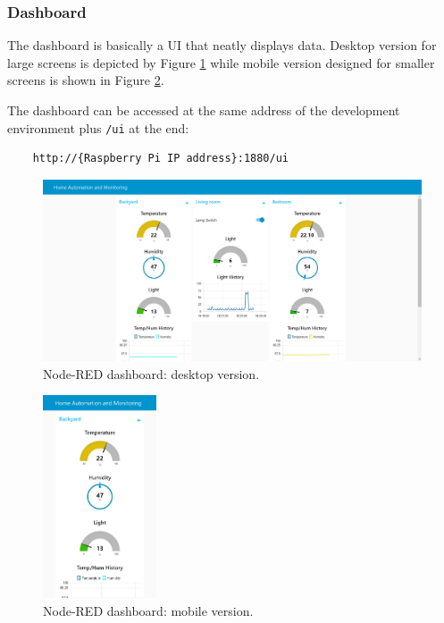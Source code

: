 \subsubsection{Dashboard}
The dashboard is basically a UI that neatly displays data. Desktop version for large screens is depicted by Figure \ref{desktop_ui} while mobile version designed for smaller screens is shown in Figure \ref{mobile_ui}.

The dashboard can be accessed at the same address of the development environment plus \texttt{/ui} at the end:

\begin{verbatim}
    http://{Raspberry Pi IP address}:1880/ui
\end{verbatim}

\begin{figure}[H]
	\begin{center}
		\includegraphics[width=1.0\textwidth]{./pictures/laptop_dashboard.JPG}
		\caption{Node-RED dashboard: desktop version.}
		\label{desktop_ui}
	\end{center}
\end{figure}

\begin{figure}[H]
	\begin{center}
		\includegraphics[width=0.3\textwidth]{./pictures/smartphone_dashboard.JPG}
		\caption{Node-RED dashboard: mobile version.}
		\label{mobile_ui}
	\end{center}
\end{figure}

